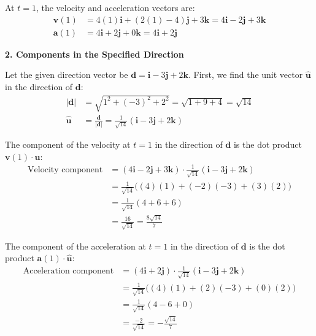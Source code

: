 \documentclass[12pt,a4paper]{article}
\begin{document}
\begin{enumerate}
\begin{tcolorbox}[enhanced,breakable,ansbox,colback=cD!4,colframe=cD,boxrule=0.8pt,arc=5pt,title={\textbf{Answer}},fonttitle=\bfseries\color{white},colbacktitle=cD]
At $t = 1$, the velocity and acceleration vectors are:
\begin{align*}
    \mathbf{v}(1) &= 4(1)\mathbf{i} + (2(1) - 4)\mathbf{j} + 3\mathbf{k} = 4\mathbf{i} - 2\mathbf{j} + 3\mathbf{k} \\
    \mathbf{a}(1) &= 4\mathbf{i} + 2\mathbf{j} + 0\mathbf{k} = 4\mathbf{i} + 2\mathbf{j}
\end{align*}

\vspace{1em}
\textbf{2. Components in the Specified Direction}

Let the given direction vector be $\mathbf{d} = \mathbf{i} - 3\mathbf{j} + 2\mathbf{k}$.
First, we find the unit vector $\hat{\mathbf{u}}$ in the direction of $\mathbf{d}$:
\begin{align*}
    |\mathbf{d}| &= \sqrt{1^2 + (-3)^2 + 2^2} = \sqrt{1 + 9 + 4} = \sqrt{14} \\
    \hat{\mathbf{u}} &= \frac{\mathbf{d}}{|\mathbf{d}|} = \frac{1}{\sqrt{14}}(\mathbf{i} - 3\mathbf{j} + 2\mathbf{k})
\end{align*}

The component of the velocity at $t=1$ in the direction of $\mathbf{d}$ is the dot product $\mathbf{v}(1) \cdot \hat{\mathbf{u}}$:
\begin{align*}
    \text{Velocity component} &= (4\mathbf{i} - 2\mathbf{j} + 3\mathbf{k}) \cdot \frac{1}{\sqrt{14}}(\mathbf{i} - 3\mathbf{j} + 2\mathbf{k}) \\
    &= \frac{1}{\sqrt{14}} \big( (4)(1) + (-2)(-3) + (3)(2) \big) \\
    &= \frac{1}{\sqrt{14}} (4 + 6 + 6) \\
    &= \frac{16}{\sqrt{14}} = \boxed{\frac{8\sqrt{14}}{7}}
\end{align*}

The component of the acceleration at $t=1$ in the direction of $\mathbf{d}$ is the dot product $\mathbf{a}(1) \cdot \hat{\mathbf{u}}$:
\begin{align*}
    \text{Acceleration component} &= (4\mathbf{i} + 2\mathbf{j}) \cdot \frac{1}{\sqrt{14}}(\mathbf{i} - 3\mathbf{j} + 2\mathbf{k}) \\
    &= \frac{1}{\sqrt{14}} \big( (4)(1) + (2)(-3) + (0)(2) \big) \\
    &= \frac{1}{\sqrt{14}} (4 - 6 + 0) \\
    &= \frac{-2}{\sqrt{14}} = \boxed{-\frac{\sqrt{14}}{7}}
\end{align*}

\end{tcolorbox}

\end{enumerate}
\end{document}
